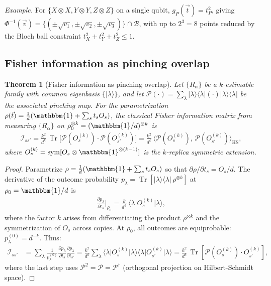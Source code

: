 \documentclass[aps,%
twocolumn,%
floatfix,%
pra,%
amsfonts,%
groupedaddress,%
superscriptaddress]{revtex4-2}%
\newtheorem{theorem}{Theorem}
\DeclareMathOperator{\tr}{Tr}
\newcommand{\bra}[1]{\langle #1\rvert}
\newcommand{\ket}[1]{\lvert #1\rangle}
\newcommand{\proj}[1]{\lvert #1\rangle\!\langle #1\rvert}
\newcommand{\ox}{\otimes}
\newcommand{\1}{\mathbbm{1}}
\newcommand*{\cP}{\mathcal{P}}
\DeclareMathOperator{\sym}{sym}
\newcommand*{\cB}{\mathcal{B}}
\newcommand*{\cI}{\mathcal{I}}
\begin{document}
\emph{Example.} For $\{X\ox X, Y\ox Y, Z\ox Z\}$ on a single qubit, $g_P(\vec{t}) = t_P^2$, giving $\Phi^{-1}(\vec{v}) = \{(\pm\sqrt{v_1}, \pm\sqrt{v_2}, \pm\sqrt{v_3})\} \cap \cB$, with up to $2^3 = 8$ points reduced by the Bloch ball constraint $t_X^2+t_Y^2+t_Z^2 \leq 1$.


\subsection{Fisher information as pinching overlap}\label{app:fisher_pinching}

\begin{theorem}[Fisher information as pinching overlap]\label{thm:fisher-pinching}
Let $\{R_\alpha\}$ be a $k$-estimable family with common eigenbasis $\{|\lambda\rangle\}$, and let $\cP(\cdot) = \sum_\lambda \proj{\lambda}(\cdot)\proj{\lambda}$ be the associated pinching map. For the parametrization $\rho(\vec{t}) = \frac{1}{d}(\1 + \sum_s t_s O_s)$, the classical Fisher information matrix from measuring $\{R_\alpha\}$ on $\rho_0^{\ox k} = (\1/d)^{\ox k}$ is
\begin{align}\label{eq:fisher-pinching}
\cI_{ss'} = \frac{k^2}{d^k}\,\tr\!\big[\cP(O_s^{(k)})\cdot\cP(O_{s'}^{(k)})\big] = \frac{k^2}{d^k}\,\langle \cP(O_s^{(k)}),\, \cP(O_{s'}^{(k)})\rangle_{\mathrm{HS}},
\end{align}
where $O_s^{(k)} = \sym[O_s \ox \1^{\ox(k-1)}]$ is the $k$-replica symmetric extension.
\end{theorem}

\begin{proof}
Parametrize $\rho = \frac{1}{d}(\1 + \sum_s t_s O_s)$ so that $\partial\rho/\partial t_s = O_s/d$. The derivative of the outcome probability $p_\lambda = \tr[\proj{\lambda}\,\rho^{\ox k}]$ at $\rho_0 = \1/d$ is
\begin{align}
\frac{\partial p_\lambda}{\partial t_s}\bigg|_{\rho_0} = \frac{k}{d^k}\,\bra{\lambda}O_s^{(k)}\ket{\lambda},
\end{align}
where the factor $k$ arises from differentiating the product $\rho^{\ox k}$ and the symmetrization of $O_s$ across copies. At $\rho_0$, all outcomes are equiprobable: $p_\lambda^{(0)} = d^{-k}$. Thus:
\begin{align}
\cI_{ss'} &= \sum_\lambda \frac{1}{p_\lambda^{(0)}}\frac{\partial p_\lambda}{\partial t_s}\frac{\partial p_\lambda}{\partial t_{s'}} = \frac{k^2}{d^k}\sum_\lambda \bra{\lambda}O_s^{(k)}\ket{\lambda}\bra{\lambda}O_{s'}^{(k)}\ket{\lambda} = \frac{k^2}{d^k}\,\tr[\cP(O_s^{(k)})\cdot O_{s'}^{(k)}],
\end{align}
where the last step uses $\cP^2 = \cP = \cP^\dagger$ (orthogonal projection on Hilbert-Schmidt space).
\end{proof}
\end{document}
